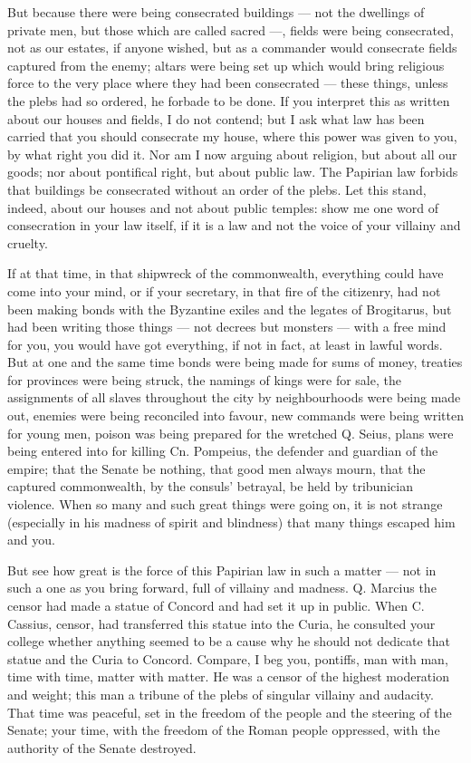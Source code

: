  But because there were being consecrated buildings --- not the dwellings of private men, but those which are called sacred ---, fields were being consecrated, not as our estates, if anyone wished, but as a commander would consecrate fields captured from the enemy; altars were being set up which would bring religious force to the very place where they had been consecrated --- these things, unless the plebs had so ordered, he forbade to be done. If you interpret this as written about our houses and fields, I do not contend; but I ask what law has been carried that you should consecrate my house, where this power was given to you, by what right you did it. Nor am I now arguing about religion, but about all our goods; nor about pontifical right, but about public law. The Papirian law forbids that buildings be consecrated without an order of the plebs. Let this stand, indeed, about our houses and not about public temples: show me one word of consecration in your law itself, if it is a law and not the voice of your villainy and cruelty.

 If at that time, in that shipwreck of the commonwealth, everything could have come into your mind, or if your secretary, in that fire of the citizenry, had not been making bonds with the Byzantine exiles and the legates of Brogitarus, but had been writing those things --- not decrees but monsters --- with a free mind for you, you would have got everything, if not in fact, at least in lawful words. But at one and the same time bonds were being made for sums of money, treaties for provinces were being struck, the namings of kings were for sale, the assignments of all slaves throughout the city by neighbourhoods were being made out, enemies were being reconciled into favour, new commands were being written for young men, poison was being prepared for the wretched Q. Seius, plans were being entered into for killing Cn. Pompeius, the defender and guardian of the empire; that the Senate be nothing, that good men always mourn, that the captured commonwealth, by the consuls' betrayal, be held by tribunician violence. When so many and such great things were going on, it is not strange (especially in his madness of spirit and blindness) that many things escaped him and you.

 But see how great is the force of this Papirian law in such a matter --- not in such a one as you bring forward, full of villainy and madness. Q. Marcius the censor had made a statue of Concord and had set it up in public. When C. Cassius, censor, had transferred this statue into the Curia, he consulted your college whether anything seemed to be a cause why he should not dedicate that statue and the Curia to Concord. Compare, I beg you, pontiffs, man with man, time with time, matter with matter. He was a censor of the highest moderation and weight; this man a tribune of the plebs of singular villainy and audacity. That time was peaceful, set in the freedom of the people and the steering of the Senate; your time, with the freedom of the Roman people oppressed, with the authority of the Senate destroyed.

